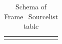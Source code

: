 \documentclass[12pt]{article}
\begin{document}
\begin{table}[thbp]
\begin{center}
{\begin{tabular}{llllll}
\hline\\
\end{tabular}
}
\caption{Schema of Frame\_Sourcelist table}
\end{center}
\end{table}
\end{document}
